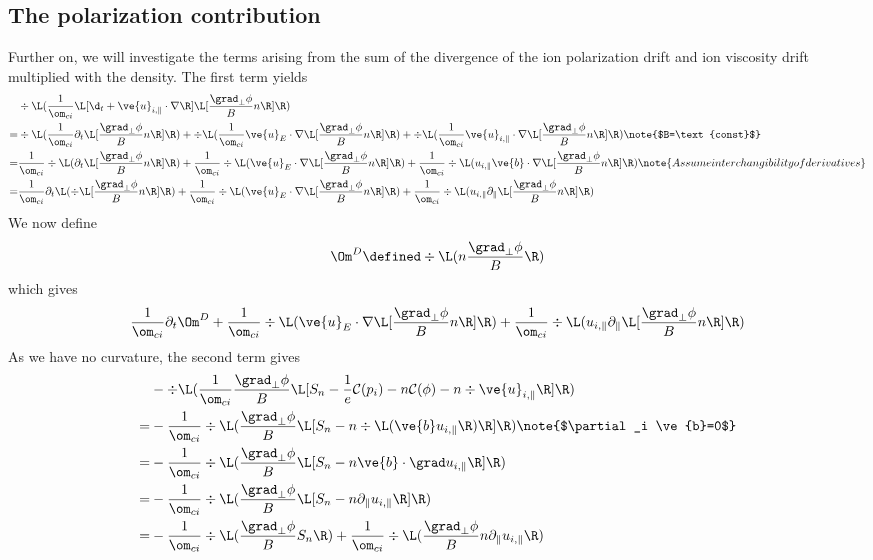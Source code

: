 \subsection{The polarization contribution}
Further on, we will investigate the terms arising from the sum of the
divergence of the ion polarization drift and ion viscosity drift multiplied
with the density. The first term yields
%
\begin{align*}
 &
 \div\L( \frac{1}{\om_{ci}}
 \L[ \d_t + \ve{u}_{i,\|}\cdot\nabla \R]
 \L[\frac{\grad_\perp \phi}{B}n\R] \R)
    \\
    =& \div\L( \frac{1}{\om_{ci}}\partial_t\L[\frac{\grad_\perp \phi}{B}n \R]\R)
    + \div\L(
    \frac{1}{\om_{ci}} \ve{u}_E\cdot\nabla \L[\frac{\grad_\perp \phi}{B} n\R]\R)
    + \div\L(
    \frac{1}{\om_{ci}} \ve{u}_{i,\|}\cdot\nabla\L[\frac{\grad_\perp \phi}{B}n\R]\R)
    \note{$B=\text{const}$}
    \\
    =& \frac{1}{\om_{ci}}\div\L(\partial_t\L[\frac{\grad_\perp \phi}{B}n \R]\R)
    + \frac{1}{\om_{ci}} \div\L(
    \ve{u}_E\cdot\nabla \L[\frac{\grad_\perp \phi}{B}n \R]\R)
    + \frac{1}{\om_{ci}} \div\L(
    u_{i,\|}\ve{b}\cdot\nabla\L[\frac{\grad_\perp \phi}{B}n\R]\R)
    \note{Assume interchangibility of derivatives}
    \\
    =& \frac{1}{\om_{ci}}\partial_t\L(\div\L[\frac{\grad_\perp \phi}{B}n \R]\R)
    + \frac{1}{\om_{ci}} \div\L(
    \ve{u}_E\cdot\nabla \L[\frac{\grad_\perp \phi}{B}n \R]\R)
    + \frac{1}{\om_{ci}} \div\L(
    u_{i,\|}\partial_\|\L[\frac{\grad_\perp \phi}{B}n\R]\R)
\end{align*}
%
We now define
%
\begin{align*}
    \Om^D \defined
    \div \L(n \frac{\grad_\perp \phi}{B} \R)
\end{align*}
%
which gives
%
\begin{align*}
    \frac{1}{\om_{ci}}\partial_t\Om^D
    + \frac{1}{\om_{ci}} \div\L(
    \ve{u}_E\cdot\nabla \L[\frac{\grad_\perp \phi}{B}n \R]\R)
    + \frac{1}{\om_{ci}} \div\L(
    u_{i,\|}\partial_\|\L[\frac{\grad_\perp \phi}{B}n\R]\R)
\end{align*}
%
As we have no curvature, the second term gives
%
\begin{align*}
    &
 - \div\L( \frac{1}{\om_{ci}}
 \frac{\grad_\perp \phi}{B}
 \L[S_{n} - \frac{1}{e}\mathcal{C}(p_i) - n \mathcal{C}(\phi)
 - n \div \ve{u}_{i,\|} \R] \R)
 \\
 =&
 - \frac{1}{\om_{ci}} \div\L(
 \frac{\grad_\perp \phi}{B}
 \L[S_{n} - n \div \L(\ve{b}u_{i,\|}\R) \R] \R)
 \note{$\partial_i \ve{b}=0$}
 \\
 =&
 - \frac{1}{\om_{ci}} \div\L(
 \frac{\grad_\perp \phi}{B}
 \L[S_{n} - n \ve{b}\cdot\grad u_{i,\|} \R] \R)
 \\
 =&
 - \frac{1}{\om_{ci}} \div\L(
 \frac{\grad_\perp \phi}{B}
 \L[S_{n} - n \partial_\| u_{i,\|} \R] \R)
 \\
 =&
 - \frac{1}{\om_{ci}} \div\L(
 \frac{\grad_\perp \phi}{B}
 S_{n} \R)
 + \frac{1}{\om_{ci}} \div\L(
 \frac{\grad_\perp \phi}{B}
 n \partial_\| u_{i,\|} \R)
\end{align*}


